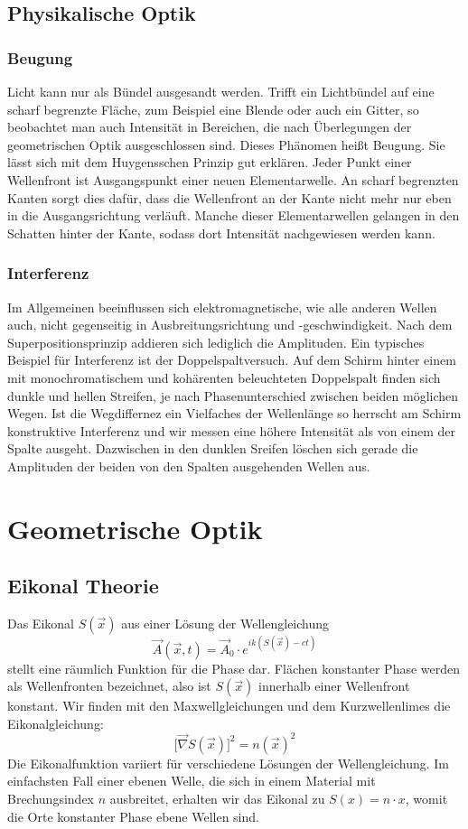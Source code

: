 \documentclass[twoside,colorback,accentcolor=tud4c,11pt]{tudreport}
\begin{document}
\subsection{Physikalische Optik}
		\subsubsection{Beugung}
			Licht kann nur als Bündel ausgesandt werden. Trifft ein Lichtbündel auf eine scharf begrenzte Fläche, zum Beispiel eine Blende oder auch ein Gitter, so beobachtet man auch Intensität in Bereichen, die nach Überlegungen der geometrischen Optik ausgeschlossen sind. Dieses Phänomen heißt Beugung. Sie lässt sich mit dem Huygensschen Prinzip gut erklären. Jeder Punkt einer Wellenfront ist Ausgangspunkt einer neuen Elementarwelle. An scharf begrenzten Kanten sorgt dies dafür, dass die Wellenfront an der Kante nicht mehr nur eben in die Ausgangsrichtung verläuft. Manche dieser Elementarwellen gelangen in den Schatten hinter der Kante, sodass dort Intensität nachgewiesen werden kann.
			\subsubsection{Interferenz}
			Im Allgemeinen beeinflussen sich elektromagnetische, wie alle anderen Wellen auch, nicht gegenseitig in Ausbreitungsrichtung und -geschwindigkeit. Nach dem Superpositionsprinzip addieren sich lediglich die Amplituden. Ein typisches Beispiel für Interferenz ist der Doppelspaltversuch. Auf dem Schirm hinter einem mit monochromatischem und kohärenten beleuchteten Doppelspalt finden sich dunkle und hellen Streifen, je nach Phasenunterschied zwischen beiden möglichen Wegen. Ist die Wegdiffernez ein Vielfaches der Wellenlänge so herrscht am Schirm konstruktive Interferenz und wir messen eine höhere Intensität als von einem der Spalte ausgeht. Dazwischen in den dunklen Sreifen löschen sich gerade die Amplituden der beiden von den Spalten ausgehenden Wellen aus.
\section{Geometrische Optik}
\subsection{Eikonal Theorie}
		Das Eikonal $S \left( \vec{x} \right)$ aus einer Lösung der Wellengleichung 
		\[
		\vec{A} \left( \vec{x} , t \right) = \vec{A}_0 \cdot e^{ik\left(S \left( \vec{x} \right)-ct\right)}
		\]
		stellt eine räumlich Funktion für die Phase dar. Flächen konstanter Phase werden als Wellenfronten bezeichnet, also ist $S\left( \vec{x} \right)$ innerhalb einer Wellenfront konstant. Wir finden mit den Maxwellgleichungen und dem Kurzwellenlimes die Eikonalgleichung:
		\[
		\lbrack \vec{\nabla} S\left( \vec{x} \right) \rbrack ^2 = n\left(\vec{x} \right)^2
		\]
		Die Eikonalfunktion variiert für verschiedene Lösungen der Wellengleichung. Im einfachsten Fall einer ebenen Welle, die sich in einem Material mit Brechungsindex $n$ ausbreitet, erhalten wir das Eikonal zu $S\left(x\right)= n\cdot x$, womit die Orte konstanter Phase ebene Wellen sind.
		
\end{document}

